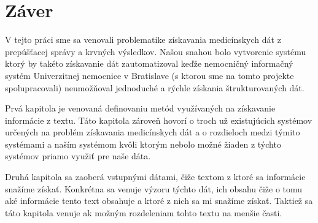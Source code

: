\chapter*{Záver}  %





V tejto práci sme sa venovali problematike získavania medicínskych dát z prepúšťacej správy a krvných výsledkov. Našou snahou bolo vytvorenie systému ktorý by takéto získavanie dát zautomatizoval keďže nemocničný informačný systém Univerzitnej nemocnice v Bratislave (s ktorou sme na tomto projekte spolupracovali) neumožňoval jednoduché a rýchle získania štrukturovaných dát. 

Prvá kapitola je venovaná definovaniu metód využívaných na získavanie informácie z textu. Táto kapitola zároveň hovorí o troch už existujúcich systémov určených na problém získavania medicínskych dát a o rozdieloch medzi týmito systémami a naším systémom kvôli ktorým nebolo možné žiaden z týchto systémov priamo využiť pre naše dáta.

Druhá kapitola sa zaoberá vstupnými dátami, čiže textom z ktoré sa informácie snažíme získať. Konkrétna sa venuje výzoru týchto dát, ich obsahu čiže o tomu aké informácie tento text obsahuje a ktoré z nich sa mi snažíme získať. Taktiež sa táto kapitola venuje ak možným rozdeleniam tohto textu na menšie časti.

